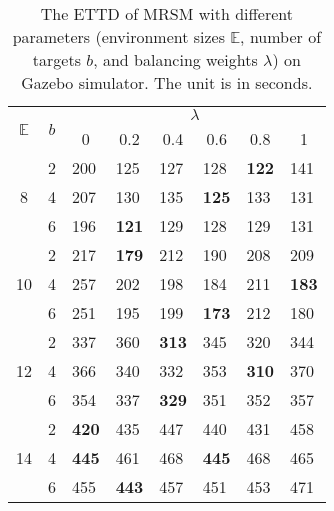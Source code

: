     \begin{table}[]
    \centering
    \caption{The ETTD of MRSM with different parameters (environment sizes $\mathbb{E}$, number of targets $b$, and balancing weights $\lambda$) on Gazebo simulator. The unit is in seconds.}
    \label{tab:ETTD-Env-lambda}
    \begin{tabular}{ccllllll}
    \hline
    \multirow{2}{*}{$\mathbb{E}$} &
      \multirow{2}{*}{$b$} &
      \multicolumn{6}{c}{$\lambda$} \\ \cline{3-8}
     &
       &
      \multicolumn{1}{c}{0} &
      \multicolumn{1}{c}{0.2} &
      \multicolumn{1}{c}{0.4} &
      \multicolumn{1}{c}{0.6} &
      \multicolumn{1}{c}{0.8} &
      \multicolumn{1}{c}{1} \\ \hline
    \multirow{3}{*}{8}  & 2 & 200          & 125          & 127          & 128          & \textbf{122} & 141          \\
                        & 4 & 207          & 130          & 135          & \textbf{125} & 133          & 131          \\
                        & 6 & 196          & \textbf{121} & 129          & 128          & 129          & 131          \\ \hline
    \multirow{3}{*}{10} & 2 & 217          & \textbf{179} & 212          & 190          & 208          & 209          \\
                        & 4 & 257          & 202          & 198          & 184          & 211          & \textbf{183} \\
                        & 6 & 251          & 195          & 199          & \textbf{173} & 212          & 180          \\ \hline
    \multirow{3}{*}{12} & 2 & 337          & 360          & \textbf{313} & 345          & 320          & 344          \\
                        & 4 & 366          & 340          & 332          & 353          & \textbf{310} & 370          \\
                        & 6 & 354          & 337          & \textbf{329} & 351          & 352          & 357          \\ \hline
    \multirow{3}{*}{14} & 2 & \textbf{420} & 435          & 447          & 440          & 431          & 458          \\
                        & 4 & \textbf{445} & 461          & 468          & \textbf{445} & 468          & 465          \\
                        & 6 & 455          & \textbf{443} & 457          & 451          & 453          & 471          \\ \hline
    \end{tabular}
    \end{table}


